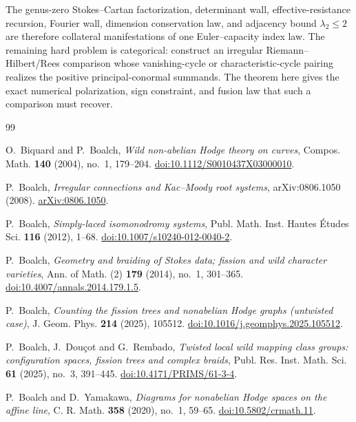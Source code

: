 \documentclass[11pt,a4paper]{amsart}
\theoremstyle{plain}
\theoremstyle{definition}
\begin{document}
The genus-zero Stokes--Cartan factorization, determinant wall, effective-resistance recursion,
Fourier wall, dimension conservation law, and adjacency bound $\lambda_2\le2$ are therefore
collateral manifestations of one Euler--capacity index law.  The remaining hard problem is
categorical: construct an irregular Riemann--Hilbert/Rees comparison whose vanishing-cycle or
characteristic-cycle pairing realizes the positive principal-conormal summands.  The theorem here
gives the exact numerical polarization, sign constraint, and fusion law that such a comparison must
recover.

\begin{thebibliography}{99}

O.~Biquard and P.~Boalch,
\emph{Wild non-abelian Hodge theory on curves},
Compos. Math. \textbf{140} (2004), no.~1, 179--204.
\href{https://doi.org/10.1112/S0010437X03000010}{doi:10.1112/S0010437X03000010}.

P.~Boalch,
\emph{Irregular connections and Kac--Moody root systems},
arXiv:0806.1050 (2008).
\href{https://arxiv.org/abs/0806.1050}{arXiv:0806.1050}.

P.~Boalch,
\emph{Simply-laced isomonodromy systems},
Publ. Math. Inst. Hautes \'{E}tudes Sci. \textbf{116} (2012), 1--68.
\href{https://doi.org/10.1007/s10240-012-0040-2}{doi:10.1007/s10240-012-0040-2}.

P.~Boalch,
\emph{Geometry and braiding of Stokes data; fission and wild character varieties},
Ann. of Math. (2) \textbf{179} (2014), no.~1, 301--365.
\href{https://doi.org/10.4007/annals.2014.179.1.5}{doi:10.4007/annals.2014.179.1.5}.

P.~Boalch,
\emph{Counting the fission trees and nonabelian Hodge graphs (untwisted case)},
J. Geom. Phys. \textbf{214} (2025), 105512.
\href{https://doi.org/10.1016/j.geomphys.2025.105512}{doi:10.1016/j.geomphys.2025.105512}.

P.~Boalch, J.~Dou\c cot and G.~Rembado,
\emph{Twisted local wild mapping class groups: configuration spaces, fission trees and complex
braids},
Publ. Res. Inst. Math. Sci. \textbf{61} (2025), no.~3, 391--445.
\href{https://doi.org/10.4171/PRIMS/61-3-4}{doi:10.4171/PRIMS/61-3-4}.

P.~Boalch and D.~Yamakawa,
\emph{Diagrams for nonabelian Hodge spaces on the affine line},
C. R. Math. \textbf{358} (2020), no.~1, 59--65.
\href{https://doi.org/10.5802/crmath.11}{doi:10.5802/crmath.11}.


\end{thebibliography}
\end{document}
